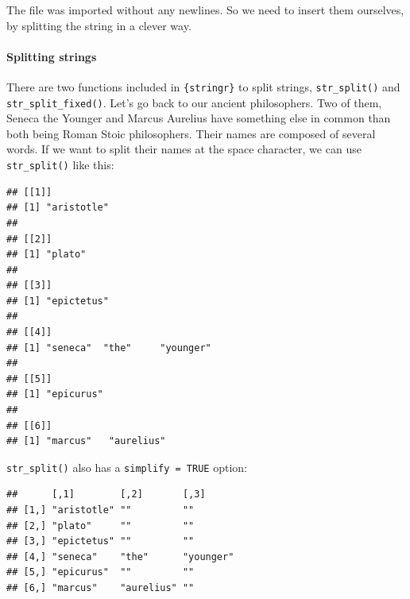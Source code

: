 \documentclass[]{gitbook}
\newenvironment{Shaded}{\begin{snugshade}}{\end{snugshade}}
\newcommand{\DataTypeTok}[1]{\textcolor[rgb]{0.13,0.29,0.53}{#1}}
\newcommand{\KeywordTok}[1]{\textcolor[rgb]{0.13,0.29,0.53}{\textbf{#1}}}
\newcommand{\NormalTok}[1]{#1}
\newcommand{\OperatorTok}[1]{\textcolor[rgb]{0.81,0.36,0.00}{\textbf{#1}}}
\newcommand{\OtherTok}[1]{\textcolor[rgb]{0.56,0.35,0.01}{#1}}
\newcommand{\StringTok}[1]{\textcolor[rgb]{0.31,0.60,0.02}{#1}}
\let\oldparagraph\paragraph
\renewcommand{\paragraph}[1]{\oldparagraph{#1}\mbox{}}
\begin{document}
The file was imported without any newlines. So we need to insert them ourselves, by splitting the
string in a clever way.

\hypertarget{splitting-strings}{%
\paragraph{Splitting strings}\label{splitting-strings}}

There are two functions included in \texttt{\{stringr\}} to split strings, \texttt{str\_split()} and \texttt{str\_split\_fixed()}.
Let's go back to our ancient philosophers. Two of them, Seneca the Younger and Marcus Aurelius have
something else in common than both being Roman Stoic philosophers. Their names are composed of several
words. If we want to split their names at the space character, we can use \texttt{str\_split()} like this:

\begin{Shaded}
\end{Shaded}

\begin{verbatim}
## [[1]]
## [1] "aristotle"
## 
## [[2]]
## [1] "plato"
## 
## [[3]]
## [1] "epictetus"
## 
## [[4]]
## [1] "seneca"  "the"     "younger"
## 
## [[5]]
## [1] "epicurus"
## 
## [[6]]
## [1] "marcus"   "aurelius"
\end{verbatim}

\texttt{str\_split()} also has a \texttt{simplify\ =\ TRUE} option:

\begin{Shaded}
\end{Shaded}

\begin{verbatim}
##      [,1]        [,2]       [,3]     
## [1,] "aristotle" ""         ""       
## [2,] "plato"     ""         ""       
## [3,] "epictetus" ""         ""       
## [4,] "seneca"    "the"      "younger"
## [5,] "epicurus"  ""         ""       
## [6,] "marcus"    "aurelius" ""
\end{verbatim}
\end{document}
